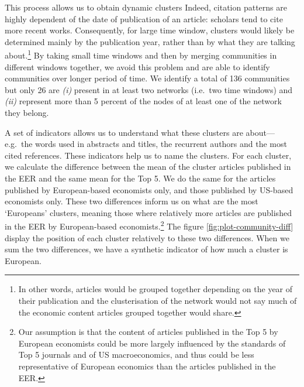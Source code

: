 \documentclass[]{elsarticle} %
\begin{document}
This process allows us to obtain dynamic clusters Indeed, citation
patterns are highly dependent of the date of publication of an article:
scholars tend to cite more recent works. Consequently, for large time
window, clusters would likely be determined mainly by the publication
year, rather than by what they are talking about.\footnote{In other
  words, articles would be grouped together depending on the year of
  their publication and the clusterisation of the network would not say
  much of the economic content articles grouped together would share.}
By taking small time windows and then by merging communities in
different windows together, we avoid this problem and are able to
identify communities over longer period of time. We identify a total of
136 communities but only 26 are \emph{(i)} present in at least two
networks (i.e.~two time windows) and \emph{(ii)} represent more than 5
percent of the nodes of at least one of the network they belong.

A set of indicators allows us to understand what these clusters are
about---e.g.~the words used in abstracts and titles, the recurrent
authors and the most cited references. These indicators help us to name
the clusters. For each cluster, we calculate the difference between the
mean of the cluster articles published in the EER and the same mean for
the Top 5. We do the same for the articles published by European-based
economists only, and those published by US-based economists only. These
two differences inform us on what are the most `Europeans' clusters,
meaning those where relatively more articles are published in the EER by
European-based economists.\footnote{Our assumption is that the content
  of articles published in the Top 5 by European economists could be
  more largely influenced by the standards of Top 5 journals and of US
  macroeconomics, and thus could be less representative of European
  economics than the articles published in the EER.} The figure
\ref{fig:plot-community-diff} display the position of each cluster
relatively to these two differences. When we sum the two differences, we
have a synthetic indicator of how much a cluster is European.
\end{document}
